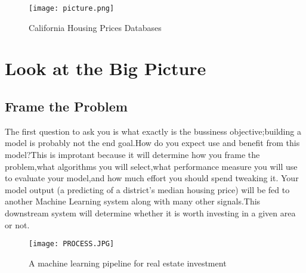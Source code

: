 \documentclass[UTF8]{ctexart}
\begin{document}
\begin{figure}[H]
\centering
\texttt{[image: picture.png]}
\caption{California Housing Prices Databases}
\end{figure}

\section{Look at the Big Picture}
\subsection{Frame the Problem}
The first question to ask you is what exactly is the bussiness objective;building a model is probably not the end goal.How do you expect use and benefit from this model?This is improtant because it will determine how you frame the problem,what algorithms you will select,what performance measure you will use to evaluate your model,and how much effort you should spend tweaking it.
Your model output (a predicting of a district's median housing price) will be fed to another Machine Learning system along with many other signals.This downstream system will determine whether it is worth investing in a given area or not.

\begin{figure}[H]
\centering
\texttt{[image: PROCESS.JPG]}
\caption{A machine learning pipeline for real estate investment}
\end{figure}
\end{document}
